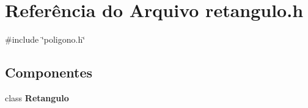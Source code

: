 \section{Referência do Arquivo retangulo.\+h}
\label{retangulo_8h}
{\ttfamily \#include \char`\"{}poligono.\+h\char`\"{}}\newline
\subsection*{Componentes}
\begin{DoxyCompactItemize}
\item 
class \textbf{ Retangulo}
\end{DoxyCompactItemize}
